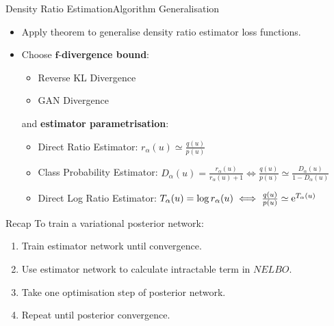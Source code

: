 \documentclass[handout]{beamer}
\newcommand{\E}{\mathbb{E}}
\begin{document}
\begin{frame}{Density Ratio Estimation}{Algorithm Generalisation}
\begin{itemize}
\item Apply theorem to generalise density ratio estimator loss functions.
\vspace{0.4cm}
\item Choose $\bm{f}$-\textbf{divergence bound}:
\begin{itemize}
\item Reverse KL Divergence
\vspace{0.2cm}
\item GAN Divergence
\end{itemize}
\vspace{0.3cm}
and \textbf{estimator parametrisation}:
\begin{itemize}
\item Direct Ratio Estimator: $r_\alpha(u)\simeq \frac{q(u)}{p(u)}$
\vspace{0.1cm}
\item Class Probability Estimator: $D_\alpha(u)=\frac{r_\alpha(u)}{r_\alpha(u)+1}\iff \frac{q(u)}{p(u)}\simeq \frac{D_\alpha(u)}{1-D_\alpha(u)}$
\vspace{0.1cm}
\item Direct Log Ratio Estimator: $T_\alpha(u)=\log r_\alpha(u)\iff \frac{q(u)}{p(u)}\simeq {\rm e}^{T_\alpha(u)}$
\end{itemize}
\end{itemize}
\end{frame}
\begin{frame}{Recap}
To train a variational posterior network:
\begin{enumerate}
\item Train estimator network until convergence.
\vspace{0.3cm}
\item Use estimator network to calculate intractable term in $NELBO$.
\vspace{0.3cm}
\item Take one optimisation step of posterior network.
\vspace{0.3cm}
\item Repeat until posterior convergence.
\end{enumerate}
\end{frame}
\end{document}
